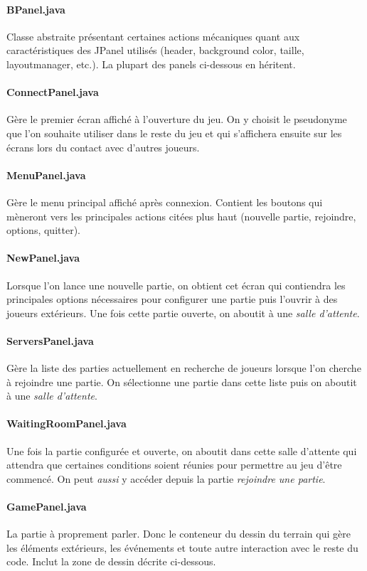 \documentclass[a4paper,12pt]{report}
\begin{document}
\paragraph{BPanel.java}
Classe abstraite présentant certaines actions mécaniques quant aux caractéristiques des JPanel utilisés (header, background color, taille, layoutmanager, etc.). La plupart des panels ci-dessous en héritent.
\paragraph{ConnectPanel.java}
Gère le premier écran affiché à l'ouverture du jeu. On y choisit le pseudonyme que l'on souhaite utiliser dans le reste du jeu et qui s'affichera ensuite sur les écrans lors du contact avec d'autres joueurs.
\paragraph{MenuPanel.java}
Gère le menu principal affiché après connexion. Contient les boutons qui mèneront vers les principales actions citées plus haut (nouvelle partie, rejoindre, options, quitter).
\paragraph{NewPanel.java}
Lorsque l'on lance une nouvelle partie, on obtient cet écran qui contiendra les principales options nécessaires pour configurer une partie puis l'ouvrir à des joueurs extérieurs. Une fois cette partie ouverte, on aboutit à une \emph{salle d'attente}.
\paragraph{ServersPanel.java}
Gère la liste des parties actuellement en recherche de joueurs lorsque l'on cherche à rejoindre une partie. On sélectionne une partie dans cette liste puis on aboutit à une \emph{salle d'attente}.
\paragraph{WaitingRoomPanel.java}
Une fois la partie configurée et ouverte, on aboutit dans cette salle d'attente qui attendra que certaines conditions soient réunies pour permettre au jeu d'être commencé. On peut \emph{aussi} y accéder depuis la partie \emph{rejoindre une partie}.
\paragraph{GamePanel.java}
La partie à proprement parler. Donc le conteneur du dessin du terrain qui gère les éléments extérieurs, les événements et toute autre interaction avec le reste du code. Inclut la zone de dessin décrite ci-dessous.
\end{document}
